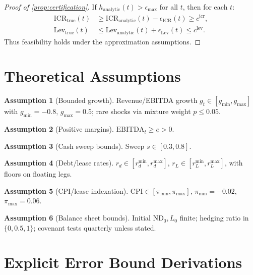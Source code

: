 \documentclass[11pt,a4paper]{article}
\newcommand{\ND}{\mathrm{ND}} %
\newcommand{\EBITDA}{\mathrm{EBITDA}}
\newcommand{\ICR}{\mathrm{ICR}}
\newcommand{\Lev}{\mathrm{Lev}}
\newcommand{\pimin}{\pi_{\min}}
\newcommand{\pimax}{\pi_{\max}}
\newcommand{\CPI}{\mathrm{CPI}}
\theoremstyle{plain}
\theoremstyle{definition}
\newtheorem{assumption}{Assumption}
\newcommand{\Cref}[1]{\ref{#1}}
\begin{document}
\begin{proof}[Proof of \Cref{prop:certification}]
If $h_{\text{analytic}}(t) > \epsilon_{\max}$ for all $t$, then for each $t$:
\begin{align}
\ICR_{\text{true}}(t) &\ge \ICR_{\text{analytic}}(t) - \epsilon_{\text{ICR}}(t) \ge c^{\text{icr}},\\
\Lev_{\text{true}}(t) &\le \Lev_{\text{analytic}}(t) + \epsilon_{\text{Lev}}(t) \le c^{\text{lev}}.
\end{align}
Thus feasibility holds under the approximation assumptions.
\end{proof}

\section{Theoretical Assumptions}
\label{app:assumptions}

\begin{assumption}[Bounded growth] \label{ass:growth}
Revenue/EBITDA growth $g_t \in [g_{\min},g_{\max}]$ with $g_{\min}=-0.8$, $g_{\max}=0.5$; rare shocks via mixture weight $p\le 0.05$.
\end{assumption}
\begin{assumption}[Positive margins] \label{ass:margins}
$\EBITDA_t \ge \underline{e} > 0$.
\end{assumption}
\begin{assumption}[Cash sweep bounds] \label{ass:sweep}
Sweep $s\in [0.3,0.8]$.
\end{assumption}
\begin{assumption}[Debt/lease rates] \label{ass:rates}
$r_d \in [r^{\min}_d,r^{\max}_d]$, $r_L \in [r^{\min}_L,r^{\max}_L]$, with floors on floating legs.
\end{assumption}
\begin{assumption}[CPI/lease indexation] \label{ass:cpi}
$\CPI\in[\pimin,\pimax]$, $\pimin=-0.02$, $\pimax=0.06$.
\end{assumption}
\begin{assumption}[Balance sheet bounds] \label{ass:bs}
Initial $\ND_0,L_0$ finite; hedging ratio in $\{0,0.5,1\}$; covenant tests quarterly unless stated.
\end{assumption}

\section{Explicit Error Bound Derivations}
\label{app:error_bounds}
\end{document}
